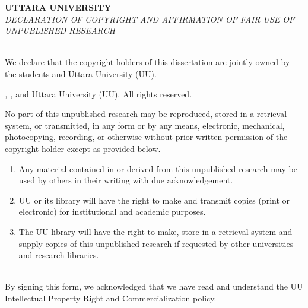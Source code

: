 \begin{center}
    \begin{tcolorbox}[colback=white, colframe=black, boxrule=1pt, width=\textwidth, arc=5pt, auto outer arc, sharp corners=south]
    \centering

    \Large\textbf{UTTARA UNIVERSITY} \\[2em]

    \large\textit{DECLARATION OF COPYRIGHT AND AFFIRMATION OF FAIR USE OF  UNPUBLISHED RESEARCH} \\[1em]

    \normalsize{\ThesisTitleUpper} \\[2em]

  \begin{justify}  We declare that the copyright holders of this dissertation are jointly owned by the students and Uttara University (UU).\\[1em] \end{justify}

    \textcopyright{} \CopyrightYear{} \textit{\StudentOneName, \StudentTwoName, \StudentThreeName} and Uttara University (UU). All rights reserved.\\[1em]

   \begin{justify} No part of this unpublished research may be reproduced, stored in a retrieval system, or transmitted, in any form or by any means, electronic, mechanical, photocopying, recording, or otherwise without prior written permission of the copyright holder except as provided below.\\[1em] \end{justify}

    \begin{enumerate}
        \item Any material contained in or derived from this unpublished research may be used by others in their writing with due acknowledgement.
        \item UU or its library will have the right to make and transmit copies (print or electronic) for institutional and academic purposes.
        \item The UU library will have the right to make, store in a retrieval system and supply copies of this unpublished research if requested by other universities and research libraries.
    \end{enumerate}

   \begin{justify} \noindent\\[1ex] By signing this form, we acknowledged that we have read and understand the UU Intellectual Property Right and Commercialization policy.\\[2em] \end{justify}


\end{tcolorbox}
\end{center}
